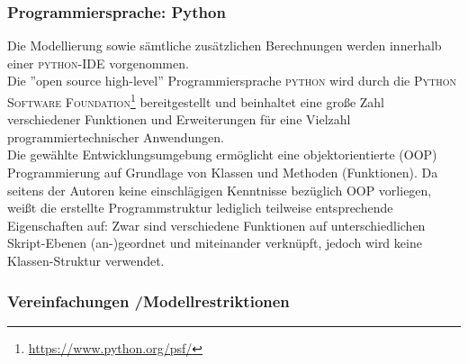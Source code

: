 \documentclass[onecolumn,10pt,titlepage]{article}
\begin{document}
\subsubsection{Programmiersprache: Python}
Die Modellierung sowie sämtliche zusätzlichen Berechnungen werden innerhalb einer \textsc{python}-IDE vorgenommen.\\
Die ''open source high-level'' Programmiersprache \textsc{python} wird durch die \textsc{Python Software Foundation\footnote{\url{https://www.python.org/psf/}}} bereitgestellt und beinhaltet eine große Zahl verschiedener Funktionen und Erweiterungen für eine Vielzahl programmiertechnischer Anwendungen.\\
Die gewählte Entwicklungsumgebung ermöglicht eine objektorientierte (OOP) Programmierung auf Grundlage von Klassen und Methoden (Funktionen).
Da seitens der Autoren keine einschlägigen Kenntnisse bezüglich OOP vorliegen, weißt die erstellte Programmstruktur lediglich teilweise entsprechende Eigenschaften auf: Zwar sind verschiedene Funktionen auf unterschiedlichen Skript-Ebenen (an-)geordnet und miteinander verknüpft, jedoch wird keine Klassen-Struktur verwendet.



\subsubsection{Vereinfachungen /Modellrestriktionen}
\label{subsubs_Mod_Vereinfach}
\end{document}
